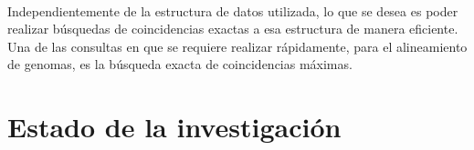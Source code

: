 \documentclass[12pt,a4paper]{article}
\begin{document}
\\Independientemente de la estructura de datos utilizada, lo que se desea es poder
realizar búsquedas de coincidencias exactas a esa estructura de manera eficiente. 
Una de las consultas en que se requiere realizar rápidamente, para el alineamiento 
de genomas, es la búsqueda exacta de coincidencias máximas. 
\section{Estado de la investigación}
\end{document}
